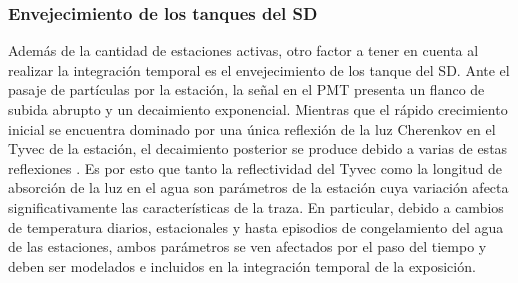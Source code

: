 	\subsubsection{Envejecimiento de los tanques del SD}
	
	Además de la cantidad de estaciones activas, otro factor a tener en cuenta al realizar la integración temporal es el envejecimiento de los tanque del SD.
% 	
	Ante el pasaje de partículas por la estación, la señal en el PMT presenta un flanco de subida abrupto y un decaimiento exponencial.
	Mientras que el rápido crecimiento inicial se encuentra dominado por una única reflexión de la luz Cherenkov en el Tyvec de la estación, el decaimiento posterior se produce debido a varias de estas reflexiones \cite{icrc}.
	Es por esto que tanto la reflectividad del Tyvec como la longitud de absorción de la luz en el agua son parámetros de la estación cuya variaci\'on afecta significativamente las características de la traza.
	En particular, debido a cambios de temperatura diarios, estacionales y hasta episodios de congelamiento del agua de las estaciones, ambos parámetros se ven afectados por el paso del tiempo y deben ser modelados e incluidos en la integraci\'on temporal de la exposici\'on.
	
